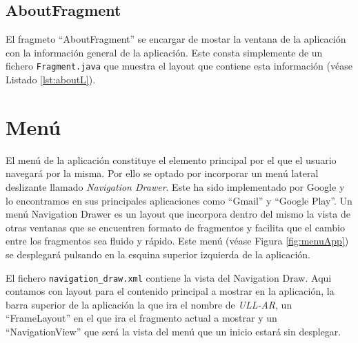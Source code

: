 
  




\subsection{AboutFragment}

El fragmeto ``AboutFragment'' se encargar de mostar la ventana de la aplicación con la información general de la aplicación. Este consta simplemente de un fichero \texttt{Fragment.java} que muestra el layout que contiene esta información (véase Listado \ref{lst:aboutL}).




\section{Menú}

El menú de la aplicación constituye el elemento principal por el que el usuario navegará por la misma. Por ello se optado por incorporar un menú lateral deslizante llamado \textit{Navigation Drawer}. Este ha sido implementado por Google y lo encontramos en sus principales aplicaciones como ``Gmail'' y ``Google Play''. Un menú Navigation Drawer es un layout que incorpora dentro del mismo la vista de otras ventanas que se encuentren formato de fragmentos  y facilita que el cambio entre los fragmentos sea fluido y rápido. Este menú (véase Figura \ref{fig:menuApp}) se desplegará pulsando en la esquina superior izquierda de la aplicación.
   
El fichero \texttt{navigation\_draw.xml} contiene la vista del Navigation Draw. Aqui contamos con layout para el contenido principal a mostrar en la aplicación, la barra superior de la aplicación la que ira el nombre de \textit{ULL-AR}, un ``FrameLayout'' en el que ira el fragmento actual a mostrar y un ``NavigationView'' que será la vista del menú que un inicio estará sin desplegar.



